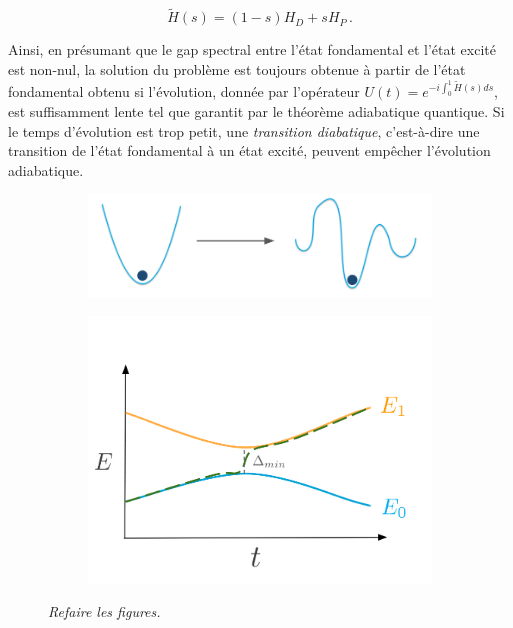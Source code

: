 \begin{equation}
\label{eq:chemin-adiabatique}    
    \tilde{H}(s) = \left(1-s\right) H_{D} + s H_{P} \,.
\end{equation}

Ainsi, en présumant que le gap spectral entre l'état fondamental et l'état excité est non-nul, la solution du problème est toujours obtenue à partir de l'état fondamental obtenu si l'évolution, donnée par l'opérateur $U(t) = e^{-i \int_{0}^{1} \tilde{H}(s) ds}$, est suffisamment lente tel que garantit par le théorème adiabatique quantique. Si le temps d'évolution est trop petit, une \textit{transition diabatique}, c'est-à-dire une transition de l'état fondamental à un état excité, peuvent empêcher l'évolution adiabatique.

\begin{figure}[ht!]
    \centering
    \begin{subfigure}{.48\textwidth}
        \centering
        \includegraphics[width=1\textwidth]{figures/algorithme-adiabatique-quantique.png}
        \caption{}
        \label{fig:algorithme-adiabatique-quantique-1}
    \end{subfigure}
    \begin{subfigure}{.48\textwidth}
        \centering
        \includegraphics[width=1\textwidth]{figures/algorithme-adiabatique-quantique-2.png}
        \caption{}
        \label{fig:algorithmne-adiabatique-quantique-2}
    \end{subfigure}
    \caption[Algorithme adiabatique quantique]{\textcolor{mydarkred}{\textit{Refaire les figures.}}}
    \label{fig:algorithme-adiabatique-quantique}
\end{figure}

